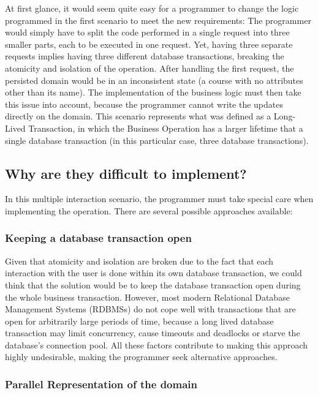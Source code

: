 \documentclass{llncs}
\begin{document}
At first glance, it would seem quite easy for a programmer to change
the logic programmed in the first scenario to meet the new
requirements: The programmer would simply have to split the code
performed in a single request into three smaller parts, each to be
executed in one request. Yet, having three separate requests implies
having three different database transactions, breaking the atomicity
and isolation of the operation. After handling the first request, the
persisted domain would be in an inconsistent state (a course with no
attributes other than its name). The implementation of the business
logic must then take this issue into account, because the programmer
cannot write the updates directly on the domain. This scenario
represents what was defined as a Long-Lived Transaction, in which the
Business Operation has a larger lifetime that a single database
transaction (in this particular case, three database transactions).

\subsection{Why are they difficult to implement?}
\label{sec:difficult}

In this multiple interaction scenario, the programmer must take
special care when implementing the operation. There are several
possible approaches available:

\subsubsection{Keeping a database transaction open}

Given that atomicity and isolation are broken due to the fact that
each interaction with the user is done within its own database
transaction, we could think that the solution would be to keep the
database transaction open during the whole business
transaction. However, most modern Relational Database Management
Systems (RDBMSs) do not cope well with transactions that are open for
arbitrarily large periods of time, because a long lived database
transaction may limit concurrency, cause timeouts and deadlocks or
starve the database's connection pool. All these factors contribute to
making this approach highly undesirable, making the programmer seek
alternative approaches.

\subsubsection{Parallel Representation of the domain}
\end{document}
